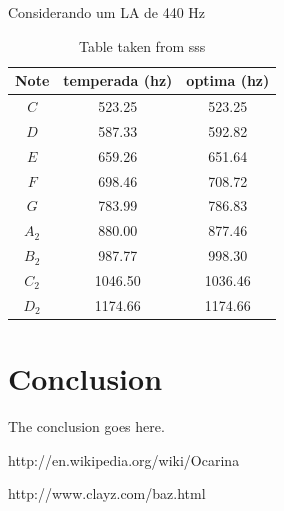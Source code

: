 \documentclass[journal]{IEEEtran}
\begin{document}
Considerando um LA de 440 Hz
\begin{table}[h]
\center
\begin{tabular}{c|c|c}
Note & temperada (hz) & optima (hz)\\ \hline
\hline                           
$C$  &  523.25 &  523.25 \\
$D$  &  587.33 &  592.82 \\
$E$  &  659.26 &  651.64 \\
$F$  &  698.46 &  708.72 \\
$G$  &  783.99 &  786.83 \\
$A_2$&  880.00 &  877.46 \\
$B_2$&  987.77 &  998.30 \\
$C_2$& 1046.50 & 1036.46 \\
$D_2$& 1174.66 & 1174.66 \\ \hline
\end{tabular}
\caption{Table taken from sss}
\label{table:example1}
\end{table}

\section{Conclusion}
The conclusion goes here.




\ifCLASSOPTIONcaptionsoff
  \newpage
\fi





%
%
%
\begin{thebibliography}{2}

http://en.wikipedia.org/wiki/Ocarina

http://www.clayz.com/baz.html

\end{thebibliography}
\end{document}
